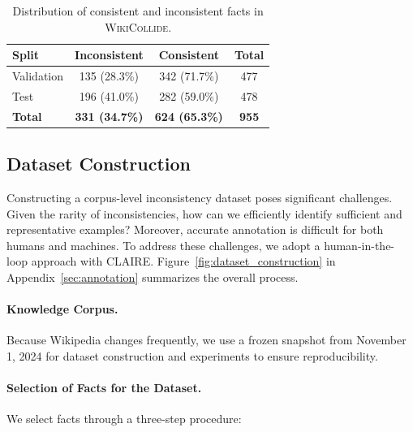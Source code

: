 \documentclass[11pt]{article}
\newcommand{\dataset}[0]{\textsc{WikiCollide}\xspace}
\newcommand{\system}[0]{\textsc{CLAIRE}\xspace}
\begin{document}
\begin{table}[ht!]
   \centering
   \small
   \begin{tabular}{@{}lccc@{}}
      \toprule
      \textbf{Split} & \textbf{Inconsistent} & \textbf{Consistent} & \textbf{Total} \\
      \midrule
      Validation & 135 (28.3\%) & 342 (71.7\%) & 477 \\
      Test       & 196 (41.0\%) & 282 (59.0\%) & 478 \\
      \midrule
      \textbf{Total} & \textbf{331 (34.7\%)} & \textbf{624 (65.3\%)} & \textbf{955} \\
      \bottomrule
   \end{tabular}
   \caption{Distribution of consistent and inconsistent facts in \dataset.}
   \label{tab:dataset_statistics}
\vspace{-1em}
\end{table}

\subsection{Dataset Construction}

Constructing a corpus-level inconsistency dataset poses significant challenges. Given the rarity of inconsistencies, how can we efficiently identify sufficient and representative examples? Moreover, accurate annotation is difficult for both humans and machines. To address these challenges, we adopt a human-in-the-loop approach with \system. Figure~\ref{fig:dataset_construction} in Appendix~\ref{sec:annotation} summarizes the overall process.

\paragraph{Knowledge Corpus.} Because Wikipedia changes frequently, we use a frozen snapshot from November 1, 2024 for dataset construction and experiments to ensure reproducibility.

\paragraph{Selection of Facts for the Dataset.} We select facts through a three-step procedure:
\end{document}
